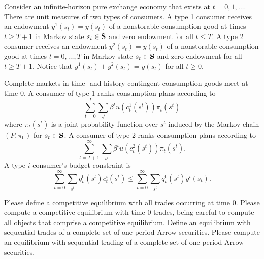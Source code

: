 \noindent Consider an infinite-horizon pure exchange economy that exists at $t=0, 1, \ldots $.
There are unit measures of  two types of consumers.
A type 1 consumer receives an endowment $y^1(s_t) = y(s_t)$ of a nonstorable consumption good at times $t\geq T+1$
in Markov state $s_t \in {\bf S}$ and zero endowment for all $ t \leq T$.  A type 2 consumer receives an endowment $y^2(s_t) = y(s_t)$ of a nonstorable consumption good at times $t =0, \ldots, T$
in Markov state $s_t \in {\bf S}$ and zero endowment for all $t \geq T+1$.  Notice that $y^1(s_t) + y^2(s_t) = y(s_t)$ for all $t \geq 0$.

Complete markets in time- and  history-contingent consumption goods
meet at time $0$. A consumer of type 1  ranks consumption plans according to 
$$ \sum_{t=0}^T \sum_{s^t} \beta^t u(c_t^1(s^t)) \pi_t(s^t)$$
where $\pi_t(s^t)$ is a joint probability function over $s^t$ induced by the Markov chain $(P, \pi_0)$ for $s_t \in 
{\bf S}$.
A consumer of type 2 ranks consumption plans according to 
$$ \sum_{t=T+1}^\infty \sum_{s^t} \beta^t u(c_t^2(s^t)) \pi_t(s^t) .$$
A type $i$ consumer's budget constraint is
$$ \sum_{t=0}^\infty \sum_{s^t} q_t^0(s^t) c^i_t(s^t) \leq  \sum_{t=0}^\infty \sum_{s^t} q_t^0(s^t) y^i(s_t) . $$
 
\medskip
{} Please define a competitive equilibrium with all trades occurring at time $0$.
\medskip
{} Please compute a competitive equilibrium with time $0$ trades, being careful to compute
all objects that comprise a competitive equilibrium.
\medskip
{} Define an equilibrium with sequential trades of a complete set of one-period Arrow  securities.
\medskip
{} Please compute an equilibrium with sequential trading of a complete set of one-period Arrow securities.




\medskip


 
\medskip

